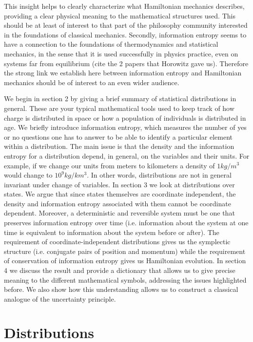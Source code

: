 \documentclass[11pt]{elsarticle}
\begin{document}
This insight helps to clearly characterize what Hamiltonian mechanics describes, providing a clear physical meaning to the mathematical structures used. This should be at least of interest to that part of the philosophy community interested in the foundations of classical mechanics. Secondly, information entropy seems to have a connection to the foundations of thermodynamics and statistical mechanics, in the sense that it is used successfully in physics practice, even on systems far from equilibrium (cite the 2 papers that Horowitz gave us). Therefore the strong link we establish here between information entropy and Hamiltonian mechanics should be of interest to an even wider audience.

We begin in section 2 by giving a brief summary of statistical distributions in general. These are your typical mathematical tools used to keep track of how charge is distributed in space or how a population of individuals is distributed in age. We briefly introduce information entropy, which measures the number of yes or no questions one has to answer to be able to identify a particular element within a distribution. The main issue is that the density and the information entropy for a distribution depend, in general, on the variables and their units. For example, if we change our units from meters to kilometers a density of $1 kg/m^3$ would change to $10^9 kg/km^3$. In other words, distributions are not in general invariant under change of variables. In section 3 we look at distributions over states. We argue that since states themselves are coordinate independent, the density and information entropy associated with them cannot be coordinate dependent. Moreover, a deterministic and reversible system must be one that preserves information entropy over time (i.e. information about the system at one time is equivalent to information about the system before or after). The requirement of coordinate-independent distributions gives us the symplectic structure (i.e. conjugate pairs of position and momentum) while the requirement of conservation of information entropy gives us Hamiltonian evolution. In section 4 we discuss the result and provide a dictionary that allows us to give precise meaning to the different mathematical symbols, addressing the issues highlighted before. We also show how this understanding allows us to construct a classical analogue of the uncertainty principle.

\section{Distributions}
\end{document}

